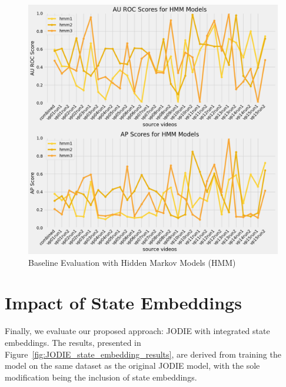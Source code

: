 \begin{figure}[h]
    \centering
    \includegraphics[width=\textwidth]{figures/05_baseline.png}
    \caption{Baseline Evaluation with Hidden Markov Models (HMM)}
    \label{fig:HMM_results}
\end{figure}


\clearpage
\section{Impact of State Embeddings}
Finally, we evaluate our proposed approach: JODIE with integrated state embeddings. The results, presented in Figure~\ref{fig:JODIE_state_embedding_results}, are derived from training the model on the same dataset as the original JODIE model, with the sole modification being the inclusion of state embeddings.


